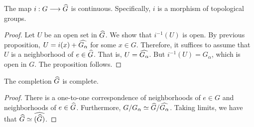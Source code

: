 \begin{prop}\label{prop:compl_is_morph_of_top_grps}
The map $i:G \longrightarrow \widehat{G}$ is continuous. Specifically, $i$
is a morphism of topological groups.
\end{prop}
\begin{proof}
Let $U$ be an open set in $\widehat{G}$. We show that $i^{-1}(U)$ 
is open. By previous proposition, $U = i(x) + \widehat{G_\alpha}$
for some $x \in G$. Therefore, it suffices to assume that $U$ is
a neighborhood of $e \in \widehat{G}$. That is, $U = 
\widehat{G_\alpha}$. But $i^{-1}(U) = G_\alpha$, which is open in
$G$. The proposition follows.
\end{proof}

\begin{cor}\label{cor:completion_is_complete}
The completion $\widehat{G}$ is complete.
\end{cor}
\begin{proof}
There is a one-to-one correspondence of neighborhoods of $e \in G$ 
and neighborhoods of $e \in \widehat{G}$. Furthermore, 
$G/G_\alpha \simeq \widehat{G}/\widehat{G_\alpha}$. Taking limits,
we have that $\widehat{G} \simeq \widehat{(\widehat{G})}$.
\end{proof}


